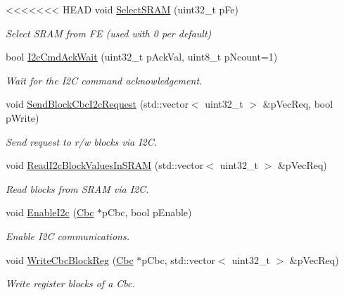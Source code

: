 \begin{DoxyCompactItemize}
\item 
<<<<<<< HEAD
void \hyperlink{class_ph2___hw_interface_1_1_cbc_interface_a628bbb6c24aa40a7d1a6bc7e9585790e}{Select\-S\-R\-A\-M} (uint32\-\_\-t p\-Fe)
\begin{DoxyCompactList}\small\item\em Select S\-R\-A\-M from F\-E (used with 0 per default) \end{DoxyCompactList}\item 
bool \hyperlink{class_ph2___hw_interface_1_1_cbc_interface_ad171e07d3777cebcdd1f65cc03915e7b}{I2c\-Cmd\-Ack\-Wait} (uint32\-\_\-t p\-Ack\-Val, uint8\-\_\-t p\-Ncount=1)
\begin{DoxyCompactList}\small\item\em Wait for the I2\-C command acknowledgement. \end{DoxyCompactList}\item 
void \hyperlink{class_ph2___hw_interface_1_1_cbc_interface_a89fb26e8441039ffa635ce189ab034be}{Send\-Block\-Cbc\-I2c\-Request} (std\-::vector$<$ uint32\-\_\-t $>$ \&p\-Vec\-Req, bool p\-Write)
\begin{DoxyCompactList}\small\item\em Send request to r/w blocks via I2\-C. \end{DoxyCompactList}\item 
void \hyperlink{class_ph2___hw_interface_1_1_cbc_interface_a5bffbf2ff373386ed92f8823ebe2cef3}{Read\-I2c\-Block\-Values\-In\-S\-R\-A\-M} (std\-::vector$<$ uint32\-\_\-t $>$ \&p\-Vec\-Req)
\begin{DoxyCompactList}\small\item\em Read blocks from S\-R\-A\-M via I2\-C. \end{DoxyCompactList}\item 
void \hyperlink{class_ph2___hw_interface_1_1_cbc_interface_a03c443239c9ee90a9d547fbcfed89df4}{Enable\-I2c} (\hyperlink{class_ph2___hw_description_1_1_cbc}{Cbc} $\ast$p\-Cbc, bool p\-Enable)
\begin{DoxyCompactList}\small\item\em Enable I2\-C communications. \end{DoxyCompactList}\item 
void \hyperlink{class_ph2___hw_interface_1_1_cbc_interface_a0829d7f94889de251860cae3f5f9d565}{Write\-Cbc\-Block\-Reg} (\hyperlink{class_ph2___hw_description_1_1_cbc}{Cbc} $\ast$p\-Cbc, std\-::vector$<$ uint32\-\_\-t $>$ \&p\-Vec\-Req)
\begin{DoxyCompactList}\small\item\em Write register blocks of a Cbc. \end{DoxyCompactList}\item 

\end{DoxyCompactItemize}
